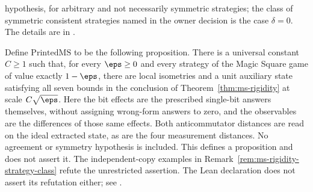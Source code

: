 \begin{remark}
hypothesis, for arbitrary and not necessarily symmetric strategies; the class of symmetric consistent strategies named in the owner decision is the case $\delta = 0$. The details are in \cite{gap:qpbt_ms-rigidity-symmetric-strategies}.
\end{remark}

\begin{definition}
  \label{def:ms-rigidity-printed-claim}
  \leanok
  Define $\mathrm{PrintedMS}$ to be the following proposition. There is a
  universal constant $C\geq1$ such that, for every $\eps\geq0$ and every
  strategy of the Magic Square game of value exactly $1-\eps$, there are
  local isometries and a unit auxiliary state satisfying all seven bounds
  in the conclusion of Theorem~\ref{thm:ms-rigidity} at scale $C\sqrt\eps$.
  Here the bit effects are the prescribed single-bit answers themselves,
  without assigning wrong-form answers to zero, and the observables are
  the differences of those same effects. Both anticommutator distances
  are read on the ideal extracted state, as are the four measurement
  distances. No agreement or symmetry hypothesis is included.
  This defines a proposition and does not assert it. The independent-copy
  examples in Remark~\ref{rem:ms-rigidity-strategy-class} refute the
  unrestricted assertion. The Lean declaration does not assert its
  refutation either; see \cite{gap:qpbt_ms-rigidity-symmetric-strategies}.
\end{definition}

